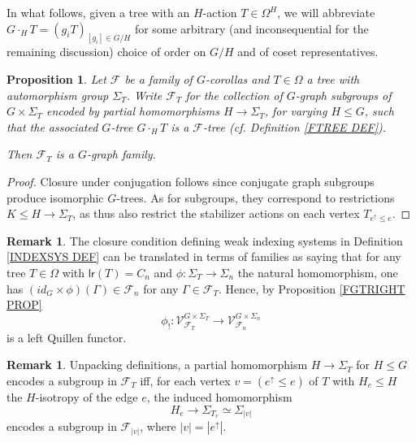 \documentclass[a4paper,10pt
,draft
]{article}%
\numberwithin{equation}{section}
\numberwithin{figure}{section}
\newtheorem{proposition}[equation]{Proposition}%
\theoremstyle{definition} %
\newtheorem{remark}[equation]{Remark}%
\newcommand{\1}{\ensuremath{\mathbbm 1}}%
\begin{document}
In what follows, given a tree with an $H$-action
$T \in \Omega^H$,
we will abbreviate
$G \cdot_H T = (g_i T)_{[g_i] \in G/H}$
for some arbitrary (and inconsequential for the remaining discussion) choice of order on $G/H$ and of coset representatives.


\begin{proposition}
Let $\mathcal{F}$ be a family of $G$-corollas and $T \in \Omega$ a tree with automorphism group $\Sigma_T$.
	Write $\mathcal{F}_T$ for the collection of $G$-graph subgroups of 
	$G \times \Sigma_T$ encoded by partial homomorphisms
	$H \to \Sigma_T$, for varying $H \leq G$,
	such that the associated $G$-tree
	$G \cdot_H T$ is a $\mathcal{F}$-tree
	(cf. Definition \ref{FTREE DEF}).
	
	Then $\mathcal{F}_T$ is a $G$-graph family.
\end{proposition}

\begin{proof}
	Closure under conjugation follows since conjugate graph subgroups produce isomorphic $G$-trees.
	As for subgroups, they correspond to restrictions $K \leq H \to \Sigma_T$,
	as thus also restrict the stabilizer actions on each vertex $T_{e^{\uparrow} \leq e}$.
\end{proof}

\begin{remark}\label{LRLEFTQUILLEN REM}
The closure condition defining weak indexing systems in Definition \ref{INDEXSYS DEF}
can be translated in terms of families as saying that for any tree $T \in \Omega$ with $\mathsf{lr}(T)=C_n$ and 
$\phi \colon \Sigma_T \to \Sigma_n$ 
the natural homomorphism, one has
$(id_G \times \phi)(\Gamma) \in \mathcal{F}_n$
for any $\Gamma \in \mathcal{F}_{T}$. 
Hence, by
Proposition \ref{FGTRIGHT PROP} 
\[
	\phi_{!}
		\colon
	\mathcal{V}^{G \times \Sigma_T}_{\mathcal{F}_T}
		\to
	\mathcal{V}^{G \times \Sigma_n}
	_{\mathcal{F}_{n}}
\]
is a left Quillen functor.
\end{remark}


\begin{remark}\label{UNPACKFTYPE REM}
Unpacking definitions, a partial homomorphism 
$H \to \Sigma_T$ for $H \leq G$
encodes a subgroup in $\mathcal{F}_T$
iff, for each vertex $v= ( e^{\uparrow} \leq e)$ of $T$ with 
$H_e \leq H$ the
$H$-isotropy of the edge $e$, the induced homomorphism
\begin{equation}\label{PARTIALHOMEDGE EQ}
H_e \to \Sigma_{T_{v}} \simeq 
\Sigma_{|v|}
\end{equation}
encodes a subgroup in $\mathcal{F}_{|v|}$, where $|v|=|e^{\uparrow}|$.
\end{remark}
\end{document}
